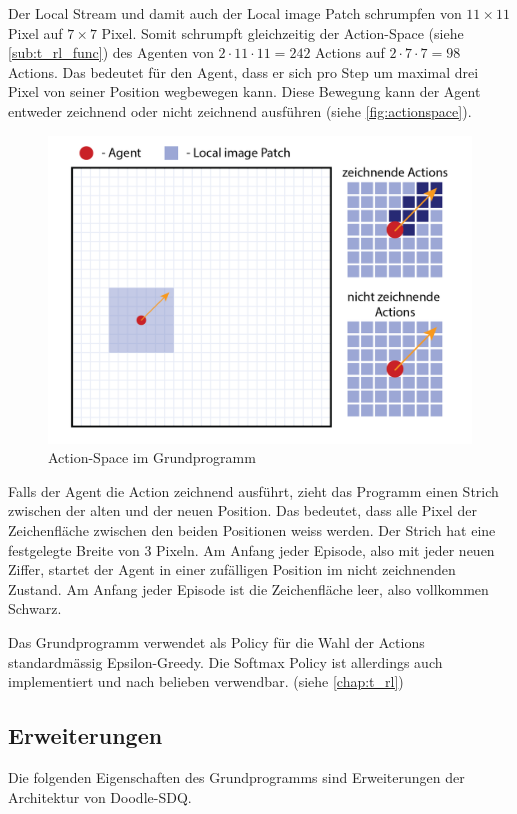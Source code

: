 Der Local Stream und damit auch der Local image Patch schrumpfen von $11\times11$
Pixel auf $7\times7$ Pixel. Somit schrumpft gleichzeitig der Action-Space (siehe
\ref{sub:t_rl_func}) des Agenten von $2\cdot11\cdot11 = 242$ Actions auf
$2\cdot7\cdot7 = 98$ Actions. Das bedeutet für den Agent, dass er sich pro Step
um maximal drei Pixel von seiner Position wegbewegen kann. Diese Bewegung kann
der Agent entweder zeichnend oder nicht zeichnend ausführen (siehe
\autoref{fig:actionspace}).
 
\begin{figure}[!ht]
 \centering
 \includegraphics[width=\textwidth]{images/methode/actionspace.png}
 \caption{Action-Space im Grundprogramm}\label{fig:actionspace}
\end{figure}
 
Falls der Agent die Action zeichnend ausführt, zieht das Programm einen Strich
zwischen der alten und der neuen Position. Das bedeutet, dass alle Pixel
der Zeichenfläche zwischen den beiden Positionen weiss werden. Der Strich hat eine
festgelegte Breite von $3$ Pixeln. Am Anfang jeder Episode, also mit jeder neuen
Ziffer, startet der Agent in einer zufälligen Position im nicht zeichnenden
Zustand. Am Anfang jeder Episode ist die Zeichenfläche leer, also vollkommen
Schwarz.

Das Grundprogramm verwendet als Policy für die Wahl der Actions standardmässig
Epsilon-Greedy. Die Softmax Policy ist allerdings auch implementiert und nach
belieben verwendbar. (siehe \ref{chap:t_rl})


\subsection{Erweiterungen}\label{sub:m_grund_erweiterungen} Die folgenden
Eigenschaften des Grundprogramms sind Erweiterungen der Architektur von
Doodle-SDQ.

